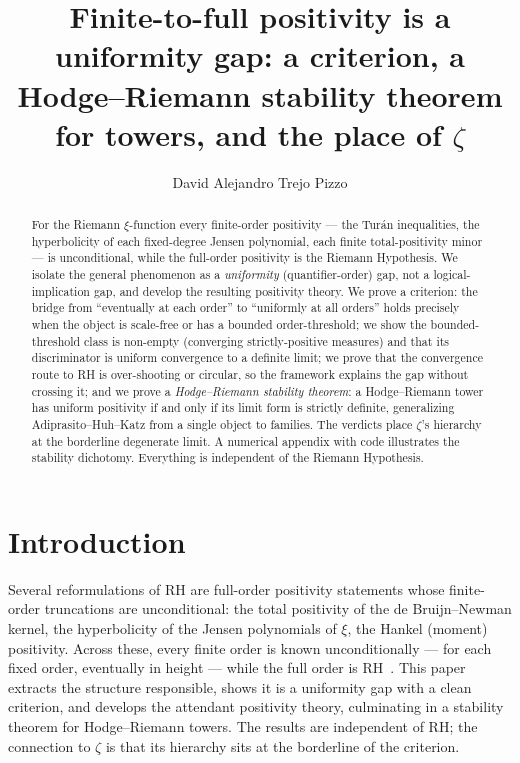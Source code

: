 \documentclass[11pt]{amsart}
\title[A Uniformity Gap]{Finite-to-full positivity is a uniformity gap: a criterion, a
Hodge--Riemann stability theorem for towers, and the place of $\zeta$}
\author{David Alejandro Trejo Pizzo}
\theoremstyle{definition}
\theoremstyle{remark}
\begin{document}
\nocite{bgIK,bgMV,bgTitchmarsh,bgConrey03}
\begin{abstract}
For the Riemann $\xi$-function every finite-order positivity --- the Tur\'an
inequalities, the hyperbolicity of each fixed-degree Jensen polynomial, each
finite total-positivity minor --- is unconditional, while the full-order
positivity is the Riemann Hypothesis. We isolate the general phenomenon as a
\emph{uniformity} (quantifier-order) gap, not a logical-implication gap, and
develop the resulting positivity theory. We prove a criterion: the bridge from
``eventually at each order'' to ``uniformly at all orders'' holds precisely when
the object is scale-free or has a bounded order-threshold; we show the
bounded-threshold class is non-empty (converging strictly-positive measures) and
that its discriminator is uniform convergence to a definite limit; we prove that
the convergence route to RH is over-shooting or circular, so the framework
explains the gap without crossing it; and we prove a \emph{Hodge--Riemann
stability theorem}: a Hodge--Riemann tower has uniform positivity if and only if
its limit form is strictly definite, generalizing Adiprasito--Huh--Katz from a
single object to families. The verdicts place $\zeta$'s hierarchy at the
borderline degenerate limit. A numerical appendix with code illustrates the
stability dichotomy. Everything is independent of the Riemann Hypothesis.
\end{abstract}
\maketitle

\tableofcontents
\newpage

\section{Introduction}
Several reformulations of RH are full-order positivity statements whose
finite-order truncations are unconditional: the total positivity of the de
Bruijn--Newman kernel, the hyperbolicity of the Jensen polynomials of $\xi$, the
Hankel (moment) positivity. Across these, every finite order is known
unconditionally --- for each fixed order, eventually in height --- while the full
order is RH~\cite{RP13,RP15}. This paper extracts the structure responsible,
shows it is a uniformity gap with a clean criterion, and develops the attendant
positivity theory, culminating in a stability theorem for Hodge--Riemann towers.
The results are independent of RH; the connection to $\zeta$ is that its
hierarchy sits at the borderline of the criterion.
\end{document}
